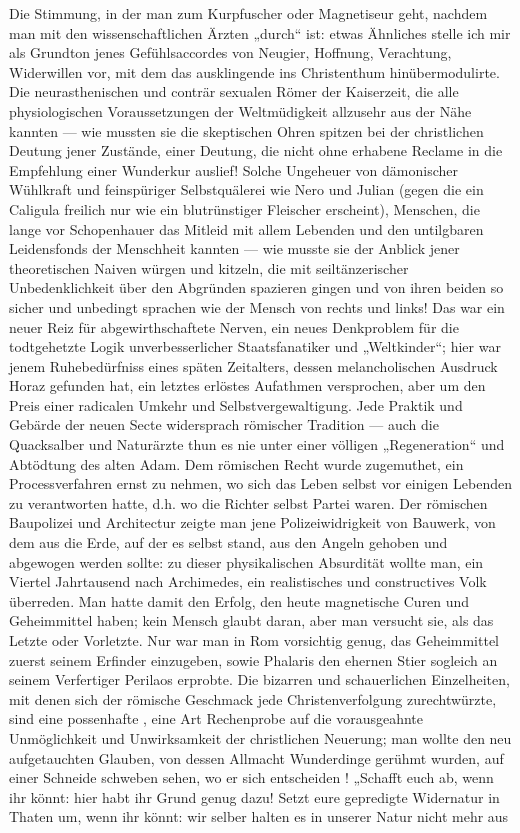 Die Stimmung, in der man zum Kurpfuscher oder Magnetiseur geht, nachdem man mit den wissenschaftlichen Ärzten „durch“ ist: etwas Ähnliches stelle ich mir als Grundton jenes Gefühlsaccordes von Neugier, Hoffnung, Verachtung, Widerwillen vor, mit dem das ausklingende  ins Christenthum hinübermodulirte. Die neurasthenischen und conträr sexualen Römer der Kaiserzeit, die alle physiologischen Voraussetzungen der Weltmüdigkeit allzusehr aus der Nähe kannten — wie mussten sie die skeptischen Ohren spitzen bei der christlichen Deutung jener Zustände, einer Deutung, die nicht ohne erhabene Reclame in die Empfehlung einer Wunderkur auslief! Solche Ungeheuer von dämonischer Wühlkraft und feinspüriger Selbstquälerei wie Nero und Julian (gegen die ein Caligula freilich nur wie ein blutrünstiger Fleischer erscheint), Menschen, die lange vor Schopenhauer das Mitleid mit allem Lebenden und den untilgbaren Leidensfonds der Menschheit kannten — wie musste sie der Anblick jener theoretischen Naiven würgen und kitzeln, die mit seiltänzerischer Unbedenklichkeit über den Abgründen spazieren gingen und von ihren beiden  so sicher und unbedingt sprachen wie der Mensch von rechts und links! Das war ein neuer Reiz für abgewirthschaftete Nerven, ein neues Denkproblem für die todtgehetzte Logik unverbesserlicher Staatsfanatiker und „Weltkinder“; hier war jenem Ruhebedürfniss eines späten Zeitalters, dessen melancholischen Ausdruck Horaz gefunden hat, ein letztes erlöstes Aufathmen versprochen, aber um den Preis einer radicalen Umkehr und Selbstvergewaltigung. Jede Praktik und Gebärde der neuen Secte widersprach römischer Tradition — auch die Quacksalber und Naturärzte thun es nie unter einer völligen „Regeneration“ und Abtödtung des alten Adam. Dem römischen Recht wurde zugemuthet, ein Processverfahren ernst zu nehmen, wo sich das Leben selbst vor einigen Lebenden zu verantworten hatte, d.h. wo die Richter selbst Partei waren. Der römischen Baupolizei und Architectur zeigte man jene Polizeiwidrigkeit von Bauwerk, von dem aus die Erde, auf der es selbst stand, aus den Angeln gehoben und abgewogen werden sollte: zu dieser physikalischen Absurdität wollte man, ein Viertel Jahrtausend nach Archimedes, ein realistisches und constructives Volk überreden. Man hatte damit den Erfolg, den heute magnetische Curen und Geheimmittel haben; kein Mensch glaubt daran, aber man versucht sie, als das Letzte oder Vorletzte. Nur war man in Rom vorsichtig genug, das Geheimmittel zuerst seinem Erfinder einzugeben, sowie Phalaris den ehernen Stier sogleich an seinem Verfertiger Perilaos erprobte. Die bizarren und schauerlichen Einzelheiten, mit denen sich der römische Geschmack jede Christenverfolgung zurechtwürzte, sind eine possenhafte , eine Art Rechenprobe auf die vorausgeahnte Unmöglichkeit und Unwirksamkeit der christlichen Neuerung; man wollte den neu aufgetauchten Glauben, von dessen Allmacht Wunderdinge gerühmt wurden, auf einer Schneide schweben sehen, wo er sich entscheiden ! „Schafft euch ab, wenn ihr könnt: hier habt ihr Grund genug dazu! Setzt eure gepredigte Widernatur in Thaten um, wenn ihr könnt: wir selber halten es in unserer Natur nicht mehr aus 